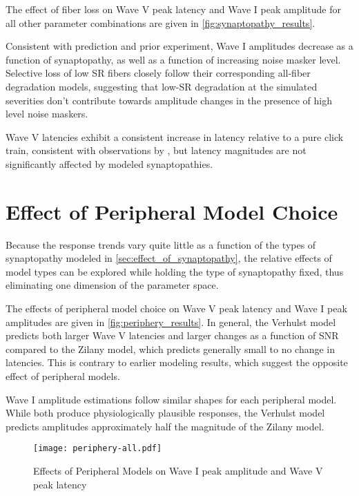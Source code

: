 The effect of fiber loss on Wave V peak latency and Wave I peak amplitude for all other parameter combinations are given in \autoref{fig:synaptopathy_results}.  

Consistent with prediction and prior experiment, Wave I amplitudes decrease as a function of synaptopathy, as well as a function of increasing noise masker level.  Selective loss of low SR fibers closely follow their corresponding all-fiber degradation models, suggesting that low-SR degradation at the simulated severities don't contribute towards amplitude changes in the presence of high level noise maskers. 

Wave V latencies exhibit a consistent increase in latency relative to a pure click train,  consistent with observations by \citeauthor{Mehraei2016Auditory}, but latency magnitudes are not significantly affected by modeled synaptopathies. 

\section{Effect of Peripheral Model Choice} %
\label{sec:effect_of_peripheral_model}
Because the response trends vary quite little as a function of the types of synaptopathy modeled in \autoref{sec:effect_of_synaptopathy}, the relative effects of model types can be explored while holding the type of synaptopathy fixed, thus eliminating one dimension of the parameter space.

The effects of peripheral model choice on Wave V peak latency and Wave I peak amplitudes are given in \autoref{fig:periphery_results}.   In general, the Verhulst model predicts both larger Wave V latencies and larger changes as a function of SNR compared to the Zilany model, which predicts generally small to no change in latencies.  This is contrary to earlier modeling results, which suggest the opposite effect of peripheral models. 

Wave I amplitude estimations follow similar shapes for each peripheral model.  While both produce physiologically plausible responses, the Verhulst model predicts amplitudes approximately half the magnitude of the Zilany model. 

\begin{figure}[htbp]
	\centering
	\texttt{[image: periphery-all.pdf]}
	\caption[Effects of Peripheral Models]{Effects of Peripheral Models on Wave I peak amplitude and Wave V peak latency}
	\label{fig:periphery_results}
\end{figure}


